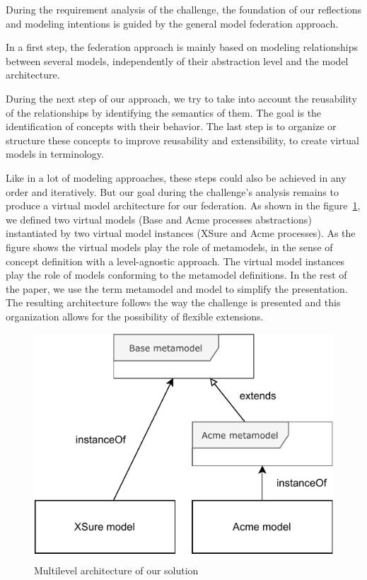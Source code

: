
During the requirement analysis of the challenge, the foundation of our reflections and modeling intentions is guided by the general model federation approach.

In a first step, the federation approach is mainly based on modeling relationships between several models, independently of their abstraction level and the model architecture.

During the next step of our approach, we try to take into account the reusability of the relationships by identifying the semantics of them. The goal is the identification of concepts with their behavior. The last step is to organize or structure these concepts to improve reusability and extensibility, to create virtual models in \FML terminology.

Like in a lot of modeling approaches, these  steps could also be achieved in any order and iteratively. But our goal during the challenge's analysis remains to produce a \FML virtual model architecture for our federation.
As shown in the figure~\ref{fig:MultilevelArchitecture}, we defined two virtual models (Base and Acme processes abstractions) instantiated by two virtual model instances (XSure and Acme processes). As the figure shows the virtual models play the role of metamodels, in the sense of concept definition with a level-agnostic approach. The virtual model instances play the role of models conforming to the metamodel definitions. In the rest of the paper, we use the term metamodel and model to simplify the presentation.
The resulting architecture follows the way the challenge is presented and this
organization allows for the possibility of flexible extensions.


\begin{figure}[t]
    \centering
    \includegraphics[width=0.7 \columnwidth]{Figures/MultilevelArchitecture.pdf}
    \caption{Multilevel architecture of our solution}
    \label{fig:MultilevelArchitecture}
\end{figure}

